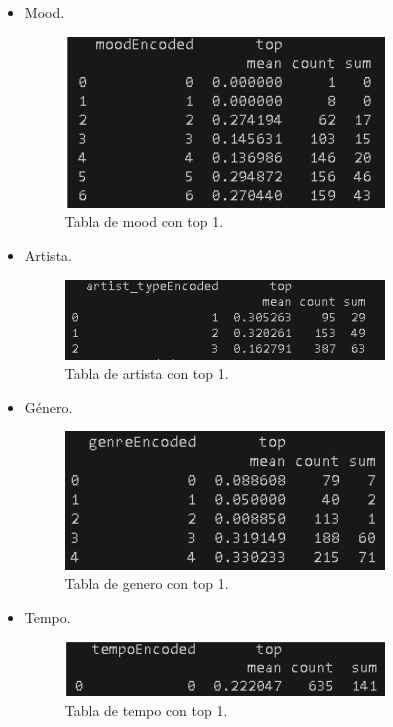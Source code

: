 \documentclass[a4paper,12pt]{article}
\begin{document}
\begin{itemize}
    \item Mood.
    \begin{figure}[H]
        \centering
        \includegraphics[width=0.8\textwidth]{20.png}
        \caption{Tabla de mood con top 1.}

    \end{figure}
    \item Artista.
    \begin{figure}[H]
        \centering
        \includegraphics[width=0.8\textwidth]{21.png}
        \caption{Tabla de artista con top 1.}

    \end{figure}
    \item Género.
    \begin{figure}[H]
        \centering
        \includegraphics[width=0.8\textwidth]{22.png}
        \caption{Tabla de genero con top 1.}

    \end{figure}
    \item Tempo.
    \begin{figure}[H]
        \centering
        \includegraphics[width=0.8\textwidth]{23.png}
        \caption{Tabla de tempo con top 1.}


\end{figure}
\end{itemize}
\end{document}
